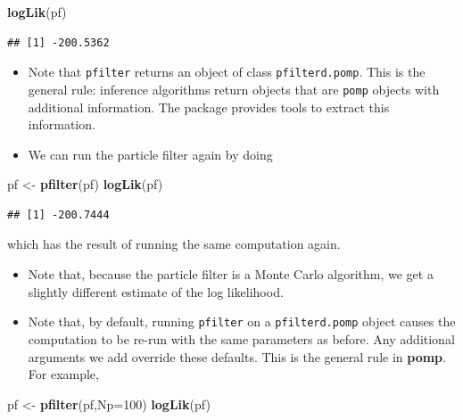 \documentclass[]{article}
\newenvironment{Shaded}{\begin{snugshade}}{\end{snugshade}}
\newcommand{\KeywordTok}[1]{\textcolor[rgb]{0.13,0.29,0.53}{\textbf{#1}}}
\newcommand{\DataTypeTok}[1]{\textcolor[rgb]{0.13,0.29,0.53}{#1}}
\newcommand{\DecValTok}[1]{\textcolor[rgb]{0.00,0.00,0.81}{#1}}
\newcommand{\StringTok}[1]{\textcolor[rgb]{0.31,0.60,0.02}{#1}}
\newcommand{\NormalTok}[1]{#1}
\begin{document}
\begin{Shaded}
\begin{Highlighting}[]
\KeywordTok{logLik}\NormalTok{(pf)}
\end{Highlighting}
\end{Shaded}

\begin{verbatim}
## [1] -200.5362
\end{verbatim}

\begin{itemize}
\item
  Note that \texttt{pfilter} returns an object of class
  \texttt{pfilterd.pomp}. This is the general rule: inference algorithms
  return objects that are \texttt{pomp} objects with additional
  information. The package provides tools to extract this information.
\item
  We can run the particle filter again by doing
\end{itemize}

\begin{Shaded}
\begin{Highlighting}[]
\NormalTok{pf <-}\StringTok{ }\KeywordTok{pfilter}\NormalTok{(pf)}
\KeywordTok{logLik}\NormalTok{(pf)}
\end{Highlighting}
\end{Shaded}

\begin{verbatim}
## [1] -200.7444
\end{verbatim}

which has the result of running the same computation again.

\begin{itemize}
\item
  Note that, because the particle filter is a Monte Carlo algorithm, we
  get a slightly different estimate of the log likelihood.
\item
  Note that, by default, running \texttt{pfilter} on a
  \texttt{pfilterd.pomp} object causes the computation to be re-run with
  the same parameters as before. Any additional arguments we add
  override these defaults. This is the general rule in \textbf{pomp}.
  For example,
\end{itemize}

\begin{Shaded}
\begin{Highlighting}[]
\NormalTok{pf <-}\StringTok{ }\KeywordTok{pfilter}\NormalTok{(pf,}\DataTypeTok{Np=}\DecValTok{100}\NormalTok{)}
\KeywordTok{logLik}\NormalTok{(pf)}
\end{Highlighting}
\end{Shaded}
\end{document}
